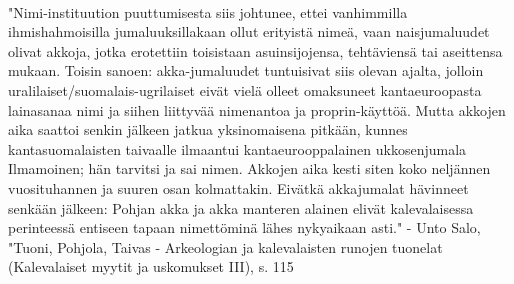   \paragraph{}

  "Nimi-instituution puuttumisesta siis johtunee, ettei vanhimmilla ihmishahmoisilla 
  jumaluuksillakaan ollut erityistä nimeä, vaan naisjumaluudet olivat akkoja, jotka erotettiin
  toisistaan asuinsijojensa, tehtäviensä tai aseittensa mukaan. Toisin sanoen: akka-jumaluudet 
  tuntuisivat siis olevan ajalta, jolloin uralilaiset/suomalais-ugrilaiset eivät vielä olleet 
  omaksuneet kantaeuroopasta lainasanaa nimi ja siihen liittyvää nimenantoa ja proprin-käyttöä. 
  Mutta akkojen aika saattoi senkin jälkeen jatkua yksinomaisena pitkään, kunnes kantasuomalaisten 
  taivaalle ilmaantui kantaeurooppalainen ukkosenjumala Ilmamoinen; hän tarvitsi ja sai nimen. 
  Akkojen aika kesti siten koko neljännen vuosituhannen ja suuren osan kolmattakin. Eivätkä 
  akkajumalat hävinneet senkään jälkeen: Pohjan akka ja akka manteren alainen elivät kalevalaisessa 
  perinteessä entiseen tapaan nimettöminä lähes nykyaikaan asti." - Unto Salo, "Tuoni, Pohjola, 
  Taivas - Arkeologian ja kalevalaisten runojen tuonelat (Kalevalaiset myytit ja 
  uskomukset III), s. 115
 